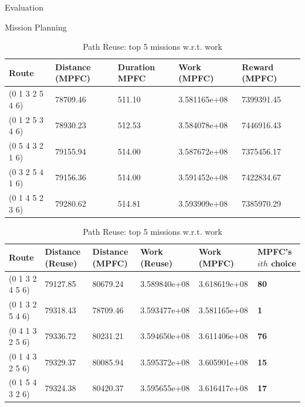 \documentclass[9pt]{beamer}
\begin{document}
\begin{frame}{Evaluation}\tiny
    \begin{block}{Mission Planning}
\begin{table}[H]
    \begin{tabular}{|l|l|l|l|l|}
\hline
Route & Distance (MPFC) & {Duration MPFC} & Work (MPFC) & Reward (MPFC) \\
\hline
(0 1 3 2 5 4 6)  &  78709.46 & 511.10 & 3.581165e+08 & 7399391.45  \\
\hline 
(0 1 2 5 3 4 6)  &  78930.23 & 512.53 & 3.584078e+08 & 7446916.43  \\
\hline
(0 5 4 3 2 1 6)  &  79155.94 & 514.00 & 3.587672e+08 & 7375456.17  \\
\hline
(0 3 2 5 4 1 6)  &  79156.36 & 514.00 & 3.591452e+08 & 7422834.67  \\
\hline 
(0 1 4 5 2 3 6)  &  79280.62 & 514.81 & 3.593909e+08 & 7385970.29  \\
\hline 
    \end{tabular}
    \caption[MPFC: top missions w.r.t. distance]{MPFC: top missions w.r.t. distance or work}
    \label{tbl:MPFC_solutions_top5}
    \begin{tabular}{|l|l|l|l|l|l|}
\hline
Route & Distance (Reuse) & Distance (MPFC) & Work (Reuse) & Work (MPFC) & \textbf{MPFC's $ith$ choice} \\
\hline
 (0 1 3 2 4 5 6) & 79127.85 & 80679.24 & 3.589840e+08 & 3.618619e+08 & \textbf{80} \\
\hline 
 (0 1 3 2 5 4 6) & 79318.43 & 78709.46 & 3.593477e+08 & 3.581165e+08 & \textbf{1} \\
\hline
 (0 4 1 3 2 5 6) & 79336.72 & 80231.21 & 3.594650e+08 & 3.611406e+08 & \textbf{76} \\
\hline
 (0 1 4 3 2 5 6) & 79329.37 & 80085.94 & 3.595372e+08 & 3.605901e+08 & \textbf{15} \\
\hline 
 (0 1 5 4 3 2 6) & 79324.38 & 80420.37 & 3.595655e+08 & 3.616417e+08 & \textbf{17} \\
\hline 
    \end{tabular}
    \caption[Reuse: top 5 missions with respect to work]{Path Reuse: top 5 missions w.r.t. work}
    \label{tbl:MPTR_solutions_top5_work}


\end{table}
\end{block}
\end{frame}
\end{document}
